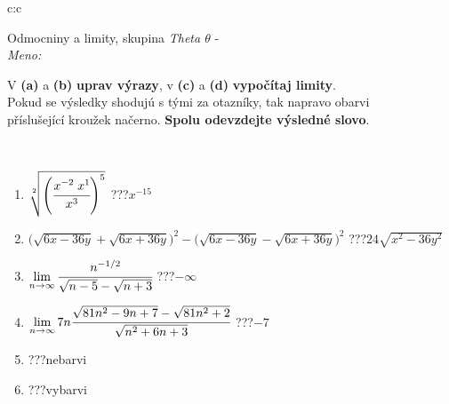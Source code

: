 \documentclass[10pt]{report}
\begin{document}
\newpage
\thispagestyle{empty}
\begin{tabular}{c:c}
\begin{minipage}[c][104.5mm][t]{0.5\linewidth}
\begin{center}
\vspace{7mm}
{\huge Odmocniny a limity, skupina \textit{Theta $\theta$} -}\\[5mm]
\textit{Meno:}\phantom{xxxxxxxxxxxxxxxxxxxxxxxxxxxxxxxxxxxxxxxxxxxxxxxxxxxxxxxxxxxxxxxxx}\\[5mm]
\begin{minipage}{0.95\linewidth}
\begin{center}
V \textbf{(a)} a \textbf{(b)} \textbf{uprav výrazy}, v \textbf{(c)} a \textbf{(d)} \textbf{vypočítaj limity}.\\Pokud se výsledky shodujú s tými za otazníky, tak napravo obarvi\\příslušející kroužek načerno. \textbf{Spolu odevzdejte výsledné slovo}.
\end{center}
\end{minipage}
\\[1mm]
\begin{minipage}{0.79\linewidth}
\begin{center}
\begin{varwidth}{\linewidth}
\begin{enumerate}
\small
\item $\sqrt[2]{\left(\cfrac{x^{-2}\;x^{1}}{x^{3}}\right)^{5}}$\quad \dotfill\; ???\;\dotfill \quad $x^{-15}$
\item {\footnotesize{\scriptsize$\big(\sqrt{6x-36y}+\sqrt{6x+36y}\big)^2-\big(\sqrt{6x-36y}-\sqrt{6x+36y}\big)^2$}\quad \dotfill\; ???\;\dotfill \quad $24\sqrt{x^2-36y^2}$}
\item $\lim\limits_{n\to\infty}\cfrac{n^{-1/2}}{\sqrt{n-5}-\sqrt{n+3}}$\quad \dotfill\; ???\;\dotfill \quad $-\infty$
\item $\lim\limits_{n\to\infty}7n\cfrac{\sqrt{81n^2-9n+7}-\sqrt{81n^2+2}}{\sqrt{n^2+6n+3}}$\quad \dotfill\; ???\;\dotfill \quad $-7$
\item \quad \dotfill\; ???\;\dotfill \quad nebarvi
\item \quad \dotfill\; ???\;\dotfill \quad vybarvi
\end{enumerate}
\end{varwidth}
\end{center}
\end{minipage}
\begin{minipage}{0.20\linewidth}
\begin{center}

\end{center}
\end{minipage}
\end{center}
\end{minipage}
\end{tabular}
\end{document}

